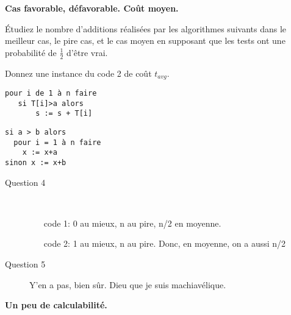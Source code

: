 \documentclass[10pt]{article}\usepackage[correction]{esial}
\begin{document}
\medskip
\Exercice \textbf{Cas favorable, défavorable. Coût moyen.}


\vspace{-.2\baselineskip}\noindent\begin{minipage}{.65\linewidth}

  \Question Étudiez le nombre d'additions réalisées par les algorithmes suivants
  dans le meilleur cas, le pire cas, et le cas moyen en supposant que les tests
  ont une probabilité de $\frac{1}{2}$ d'être vrai.

  \Question Donnez une instance du code 2 de coût $t_{avg}$.

\end{minipage}\hfill\begin{minipage}{.3\linewidth}
\vspace{-.7\baselineskip}
\begin{Verbatim}[label=code 1]
pour i de 1 à n faire
   si T[i]>a alors
       s := s + T[i]  
\end{Verbatim}

\begin{Verbatim}[label=code 2]
si a > b alors 
  pour i = 1 à n faire 
    x := x+a 
sinon x := x+b
\end{Verbatim}
\end{minipage}


\begin{Reponse}
  \begin{description}
  \item[Question 4] ~
    \begin{enumerate}
    \item[code 1:] 0 au mieux, n au pire, n/2 en moyenne. 
    \item[code 2:] 1 au mieux, n au pire. Donc, en moyenne, on a aussi n/2
    \end{enumerate}
  \item[Question 5] Y'en a pas, bien sûr. Dieu que je suis machiavélique.
  \end{description}
\end{Reponse}

\vspace{-.4\baselineskip}
\Exercice \textbf{Un peu de calculabilité.}  
\end{document}

